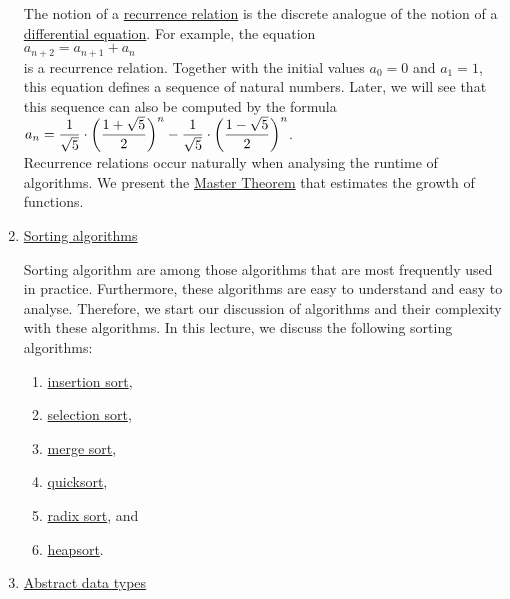 \begin{enumerate}
      The notion of a \href{http://en.wikipedia.org/wiki/Recurrence_relation}{recurrence relation}
      is the discrete analogue of the notion of a 
      \href{http://en.wikipedia.org/wiki/Differential_equation}{differential equation}.
      For example, the equation
      \\[0.2cm]
      \hspace*{1.3cm}
      $a_{n+2} = a_{n+1} + a_n$
      \\[0.2cm]
      is a recurrence relation.  Together with the initial values $a_0 = 0$ and $a_1 = 1$, this equation
      defines a sequence of natural numbers.  Later, we will see that this sequence can also be computed by
      the formula
      \\[0.2cm]
      \hspace*{1.3cm}
      $\displaystyle a_{n} = \frac{1}{\sqrt{5}} \cdot \biggl(\frac{1+\sqrt{5}}{2}\biggr)^n - \frac{1}{\sqrt{5}} \cdot \biggl(\frac{1-\sqrt{5}}{2}\biggr)^n$.
      \\[0.2cm]
      Recurrence relations occur naturally when analysing the runtime of algorithms.  We present the 
      \href{https://en.wikipedia.org/wiki/Master_theorem_(analysis_of_algorithms)}{Master Theorem} that estimates
      the growth of  functions.
\item \href{http://en.wikipedia.org/wiki/Sorting_algorithm}{Sorting algorithms}

      Sorting algorithm are among those algorithms that are most frequently used in practice.  Furthermore,
      these algorithms are easy to understand and easy to analyse.  Therefore, we start our discussion of
      algorithms and their complexity with these algorithms.  In this lecture, we discuss the following
      sorting algorithms: 
      \begin{enumerate}
      \item \href{http://en.wikipedia.org/wiki/Insertion_sort}{insertion sort},
      \item \href{http://en.wikipedia.org/wiki/Selection_sort}{selection sort},
      \item \href{http://en.wikipedia.org/wiki/Merge_sort}{merge sort}, 
      \item \href{http://en.wikipedia.org/wiki/Quicksort}{quicksort}, 
      \item \href{http://en.wikipedia.org/wiki/Radix_sort}{radix sort}, and
      \item \href{https://en.wikipedia.org/wiki/Heapsort}{heapsort}.
      \end{enumerate}
\item \href{http://en.wikipedia.org/wiki/Abstract_data_types}{Abstract data types}


\end{enumerate}
